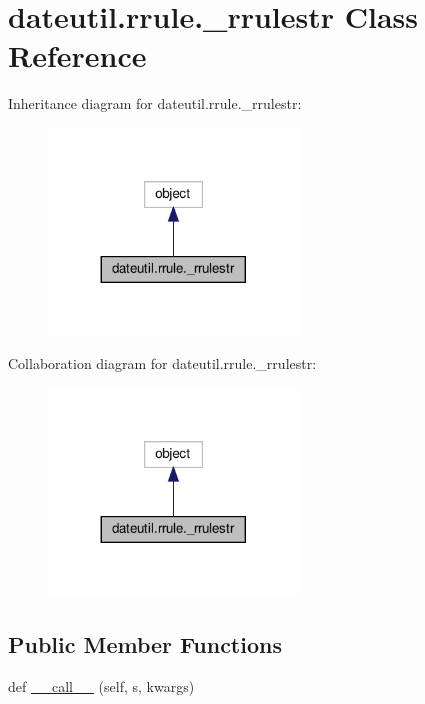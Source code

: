 \hypertarget{classdateutil_1_1rrule_1_1__rrulestr}{}\section{dateutil.\+rrule.\+\_\+rrulestr Class Reference}
\label{classdateutil_1_1rrule_1_1__rrulestr}


Inheritance diagram for dateutil.\+rrule.\+\_\+rrulestr\+:
\nopagebreak
\begin{figure}[H]
\begin{center}
\leavevmode
\includegraphics[width=188pt]{classdateutil_1_1rrule_1_1__rrulestr__inherit__graph}
\end{center}
\end{figure}


Collaboration diagram for dateutil.\+rrule.\+\_\+rrulestr\+:
\nopagebreak
\begin{figure}[H]
\begin{center}
\leavevmode
\includegraphics[width=188pt]{classdateutil_1_1rrule_1_1__rrulestr__coll__graph}
\end{center}
\end{figure}
\subsection*{Public Member Functions}
\begin{DoxyCompactItemize}
\item 
def \hyperlink{classdateutil_1_1rrule_1_1__rrulestr_abde53f71604fe9029860f233a31d67a9}{\+\_\+\+\_\+call\+\_\+\+\_\+} (self, s, kwargs)
\end{DoxyCompactItemize}


